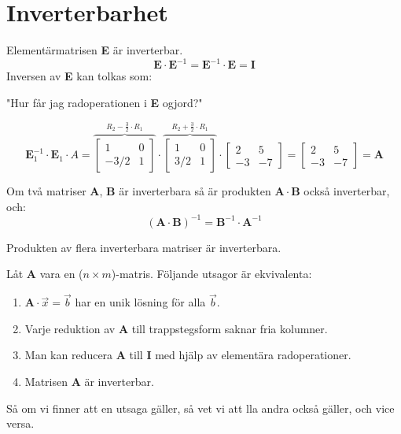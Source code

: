 \section{Inverterbarhet} %
\label{sec:inverterbarhet}
Elementärmatrisen \textbf{E} är inverterbar.
\[
    \mathbf{E} \cdot \mathbf{E}^{-1} = \mathbf{E}^{-1} \cdot \mathbf{E} = \mathbf{I}
\]
Inversen av \textbf{E} kan tolkas som:
\begin{center}
	"Hur får jag radoperationen i \textbf{E} ogjord?"
\end{center}
\begin{Ex}
    \[
        \mathbf{E}_1^{-1} \cdot \mathbf{E}_1 \cdot A = \overbrace{\begin{bmatrix} 1&0\\-3/2&1 \end{bmatrix}}^{R_2 - \frac{3}{2} \cdot R_1} \cdot \overbrace{\begin{bmatrix} 1&0\\3/2&1 \end{bmatrix}}^{R_2 + \frac{3}{2} \cdot R_1}\cdot \begin{bmatrix} 2&5\\-3&-7 \end{bmatrix} = \begin{bmatrix} 2&5\\-3&-7 \end{bmatrix} = \mathbf{A}
    \]
\end{Ex}
\begin{sats}
    Om två matriser \textbf{A}, \textbf{B} är inverterbara så är produkten $\mathbf{A} \cdot \mathbf{B}$ också inverterbar, och:
    \[
        (\mathbf{A} \cdot \mathbf{B})^{-1} = \mathbf{B}^{-1} \cdot \mathbf{A}^{-1}
    \]
\end{sats}
\begin{sats}
    Produkten av flera inverterbara matriser är inverterbara.
\end{sats}
\begin{sats}
    Låt \textbf{A} vara en ($n \times m$)-matris. Följande utsagor är ekvivalenta:
    \begin{enumerate}
    	\item $\mathbf{A} \cdot \vec{x} = \vec{b}$ har en unik lösning för alla $\vec{b}$.
    	\item Varje reduktion av \textbf{A} till trappstegsform saknar fria kolumner.
    	\item Man kan reducera \textbf{A} till \textbf{I} med hjälp av elementära radoperationer.
    	\item Matrisen \textbf{A} är inverterbar.
    \end{enumerate}
\end{sats}
Så om vi finner att en utsaga gäller, så vet vi att lla andra också gäller, och vice versa.

